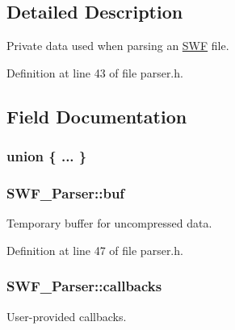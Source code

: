 \begin{DoxyCompactItemize}
\begin{tabbing}
\end{tabbing}\end{DoxyCompactItemize}


\subsection{Detailed Description}
Private data used when parsing an \hyperlink{struct_s_w_f}{S\+W\+F} file. 

Definition at line 43 of file parser.\+h.



\subsection{Field Documentation}
\hypertarget{struct_s_w_f___parser_a15374f3a7d108a724c0e9a6513aaa070}{}\subsubsection[{"@1}]{\setlength{\rightskip}{0pt plus 5cm}union \{ ... \} }\label{struct_s_w_f___parser_a15374f3a7d108a724c0e9a6513aaa070}
\hypertarget{struct_s_w_f___parser_aee4f16e3f852e7ac2e0eeac8795a15cf}{}
\subsubsection[{buf}]{ S\+W\+F\+\_\+\+Parser\+::buf}\label{struct_s_w_f___parser_aee4f16e3f852e7ac2e0eeac8795a15cf}


Temporary buffer for uncompressed data. 



Definition at line 47 of file parser.\+h.

\hypertarget{struct_s_w_f___parser_a7ac999619795fa6e6bb4132af080eae6}{}
\subsubsection[{callbacks}]{ S\+W\+F\+\_\+\+Parser\+::callbacks}\label{struct_s_w_f___parser_a7ac999619795fa6e6bb4132af080eae6}


User-\/provided callbacks. 



